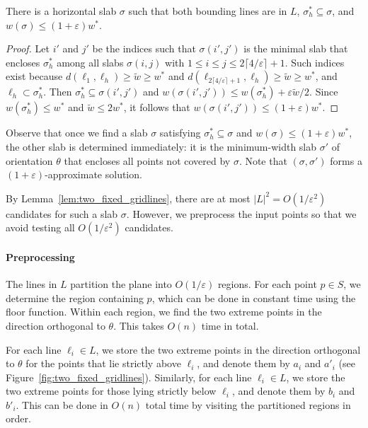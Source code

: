 \documentclass[english,a4paper, cleveref, autoref, thm-restate, nolineno]{socg-lipics-v2021}
\theoremstyle{star}
\theoremstyle{claimstar}
\newcommand{\eps}{\ensuremath{\varepsilon}}
\begin{document}
\begin{lemma}
    \label{lem:two_fixed_gridlines}
    There is a horizontal slab $\sigma$ such that  
    both bounding lines are in $L$, 
    $\sigma_h^* \subseteq \sigma $, and $w(\sigma) \le (1 + \eps) w^*$.
\end{lemma}
\begin{proof}
    Let $i'$ and $j'$ be the indices such that $\sigma(i', j')$ is the minimal slab that encloses $\sigma_h^*$ among all slabs $\sigma(i,j)$ with $1 \le i \le j \le 2\lceil 4/\eps \rceil + 1$.
    Such indices exist because $d(\ell_1, \ell_h) \ge \widetilde w \ge w^*$ and $d(\ell_{2 \lceil 4/\eps \rceil +1 }, \ell_h)\ge \widetilde w \ge w^*$, and $\ell_h \subset \sigma_h^*$. 
    Then $\sigma_h^* \subseteq \sigma(i', j')$ and $w(\sigma(i', j')) \le w(\sigma_h^*) + \eps \widetilde{w}/2$. 
    Since $w(\sigma_h^*) \le w^*$ and $\widetilde w \le 2w^*$, it follows that $w(\sigma(i', j')) \le (1+\eps) w^*$. 
\end{proof}

Observe that once we find a slab $\sigma$ satisfying $\sigma_h^* \subseteq \sigma$ and 
$w(\sigma) \le (1+\eps)w^*$, the other slab is determined immediately: it is the minimum-width slab 
$\sigma'$ of orientation $\theta$ that encloses all points not covered by $\sigma$.  
Note that $(\sigma, \sigma')$ forms a $(1+\eps)$-approximate solution.

By Lemma~\ref{lem:two_fixed_gridlines},   there are at most $|L|^2 = O(1/\eps^2)$ candidates for such a slab $\sigma$.  
However, we preprocess the input points so that we avoid testing all $O(1/\eps^2)$ candidates.


\paragraph*{Preprocessing}
The lines in $L$ partition the plane into $O(1/\eps)$ regions. 
For each point $p \in S$, we determine the region containing $p$, which can be done in constant time using the floor function.  
Within each region, we find the two extreme points in the direction orthogonal to $\theta$. 
This takes $O(n)$ time in total. 

For each line $\ell_i \in L$, we store the two extreme points in the direction orthogonal to $\theta$ for the points that lie strictly above $\ell_i$, and denote them by $a_i$ and $a'_i$ (see Figure~\ref{fig:two_fixed_gridlines}).
Similarly, for each line $\ell_i \in L$, we store the two extreme points for those lying strictly below $\ell_i$, and denote them by $b_i$ and $b'_i$.
This can be done in $O(n)$ total time by visiting the partitioned regions in order. 
\end{document}
